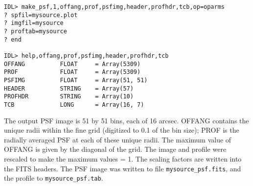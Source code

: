 \medskip\noindent
\begin{verbatim}
IDL> make_psf,1,offang,prof,psfimg,header,profhdr,tcb,op=oparms
? spfil=mysource.plot
? imgfil=mysource
? proftab=mysource
? end
 
IDL> help,offang,prof,psfimg,header,profhdr,tcb
OFFANG          FLOAT     = Array(5309)
PROF            FLOAT     = Array(5309)
PSFIMG          FLOAT     = Array(51, 51)
HEADER          STRING    = Array(57)
PROFHDR         STRING    = Array(10)
TCB             LONG      = Array(16, 7)
\end{verbatim}
The output PSF image is 51 by 51 bins, each of 16 arcsec. OFFANG contains the
unique radii within the fine grid (digitized to 0.1 of the bin size); PROF is
the radially averaged PSF at each of these unique radii. The  maximum value of
OFFANG is given by the diagonal of the grid. The image and  profile were
rescaled to make the maximum values = 1. The scaling factors are written into
the FITS headers. The PSF image was written to file {\tt mysource{\_}psf.fits}, and
the profile to {\tt mysource{\_}psf.tab}.

